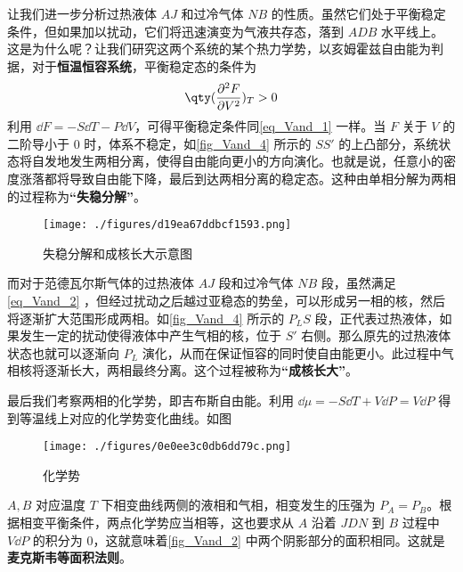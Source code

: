 让我们进一步分析过热液体 $AJ$ 和过冷气体 $NB$ 的性质。虽然它们处于平衡稳定条件，但如果加以扰动，它们将迅速演变为气液共存态，落到 $ADB$ 水平线上。这是为什么呢？让我们研究这两个系统的某个热力学势，以亥姆霍兹自由能为判据，对于\textbf{恒温恒容系统}，平衡稳定态的条件为
\begin{equation}\label{eq_Vand_2}
\qty(\frac{\partial^2 F}{\partial V^2})_T>0
\end{equation}
利用 $\dd F=-S\dd T-P\dd V$，可得平衡稳定条件同\autoref{eq_Vand_1} 一样。当 $F$ 关于 $V$ 的二阶导小于 $0$ 时，体系不稳定，如\autoref{fig_Vand_4} 所示的 $SS'$ 的上凸部分，系统状态将自发地发生两相分离，使得自由能向更小的方向演化。也就是说，任意小的密度涨落都将导致自由能下降，最后到达两相分离的稳定态。这种由单相分解为两相的过程称为\textbf{“失稳分解”}。
\begin{figure}[ht]
\centering
\texttt{[image: ./figures/d19ea67ddbcf1593.png]}
\caption{失稳分解和成核长大示意图} \label{fig_Vand_4}
\end{figure}
而对于范德瓦尔斯气体的过热液体 $AJ$ 段和过冷气体 $NB$ 段，虽然满足\autoref{eq_Vand_2} ，但经过扰动之后越过亚稳态的势垒，可以形成另一相的核，然后将逐渐扩大范围形成两相。如\autoref{fig_Vand_4} 所示的 $P_LS$ 段，正代表过热液体，如果发生一定的扰动使得液体中产生气相的核，位于 $S'$ 右侧。那么原先的过热液体状态也就可以逐渐向 $P_L$ 演化，从而在保证恒容的同时使自由能更小。此过程中气相核将逐渐长大，两相最终分离。这个过程被称为\textbf{“成核长大”}。



最后我们考察两相的化学势，即吉布斯自由能。利用 $\dd \mu=-S\dd T+V\dd P=V\dd P$ 得到等温线上对应的化学势变化曲线。如图

\begin{figure}[ht]
\centering
\texttt{[image: ./figures/0e0ee3c0db6dd79c.png]}
\caption{化学势} \label{fig_Vand_3}
\end{figure}
$A,B$ 对应温度 $T$ 下相变曲线两侧的液相和气相，相变发生的压强为 $P_A=P_B$。根据相变平衡条件，两点化学势应当相等，这也要求从 $A$ 沿着 $JDN$ 到 $B$ 过程中 $V\dd P$ 的积分为 $0$，这就意味着\autoref{fig_Vand_2} 中两个阴影部分的面积相同。这就是\textbf{麦克斯韦等面积法则}。